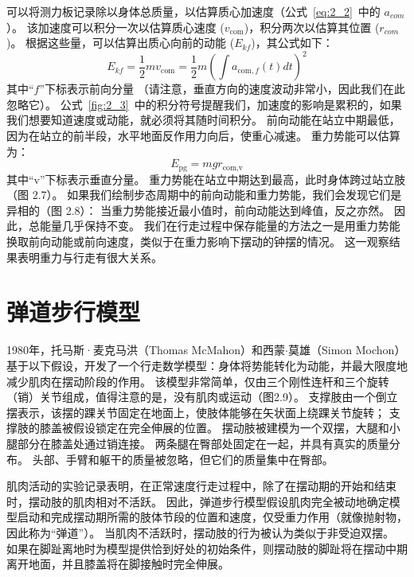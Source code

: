可以将测力板记录除以身体总质量，以估算质心加速度（公式~\ref{eq:2_2}~中的 $a_{com}$）。
该加速度可以积分一次以估算质心速度 ($v_{\text{com}}$)，积分两次以估算其位置 ($r_{com}$)。
根据这些量，可以估算出质心向前的动能 ($E_{kf}$)，其公式如下：
\begin{equation}
	E_{kf} = \frac{1}{2} m v_{\text{com}}
		   = \frac{1}{2} m 
		   	 ( \int a_{\text{com},f} (t) dt )^2  \label{eq:2_3}
\end{equation}
%
其中“$f$”下标表示前向分量
（请注意，垂直方向的速度波动非常小，因此我们在此忽略它）。
公式~\ref{fig:2_3}~中的积分符号提醒我们，加速度的影响是累积的，如果我们想要知道速度或动能，就必须将其随时间积分。
前向动能在站立中期最低，因为在站立的前半段，水平地面反作用力向后，使重心减速。
重力势能可以估算为：
\begin{equation}
	E_{\text{pg}} 
		= m g r_{\text{com},\text{v}} \label{eq:2_4}
\end{equation}
%
其中“v”下标表示垂直分量。
重力势能在站立中期达到最高，此时身体跨过站立肢（图 2.7）。
如果我们绘制步态周期中的前向动能和重力势能，我们会发现它们是异相的（图 2.8）：
当重力势能接近最小值时，前向动能达到峰值，反之亦然。
因此，总能量几乎保持不变。
我们在行走过程中保存能量的方法之一是用重力势能换取前向动能或前向速度，类似于在重力影响下摆动的钟摆的情况。
这一观察结果表明重力与行走有很大关系。


\section{弹道步行模型}

1980年，托马斯·麦克马洪（Thomas McMahon）和西蒙$\cdot$莫雄（Simon Mochon）基于以下假设，开发了一个行走数学模型：身体将势能转化为动能，并最大限度地减少肌肉在摆动阶段的作用。
该模型非常简单，仅由三个刚性连杆和三个旋转（销）关节组成，值得注意的是，没有肌肉或运动（图2.9）。
支撑肢由一个倒立摆表示，该摆的踝关节固定在地面上，使肢体能够在矢状面上绕踝关节旋转；
支撑肢的膝盖被假设锁定在完全伸展的位置。
摆动肢被建模为一个双摆，大腿和小腿部分在膝盖处通过销连接。
两条腿在臀部处固定在一起，并具有真实的质量分布。
头部、手臂和躯干的质量被忽略，但它们的质量集中在臀部。


肌肉活动的实验记录表明，在正常速度行走过程中，除了在摆动期的开始和结束时，摆动肢的肌肉相对不活跃。
因此，弹道步行模型假设肌肉完全被动地确定模型启动和完成摆动期所需的肢体节段的位置和速度，仅受重力作用（就像抛射物，因此称为“弹道”）。
当肌肉不活跃时，摆动肢的行为被认为类似于非受迫双摆。
如果在脚趾离地时为模型提供恰到好处的初始条件，则摆动肢的脚趾将在摆动中期离开地面，并且膝盖将在脚接触时完全伸展。


